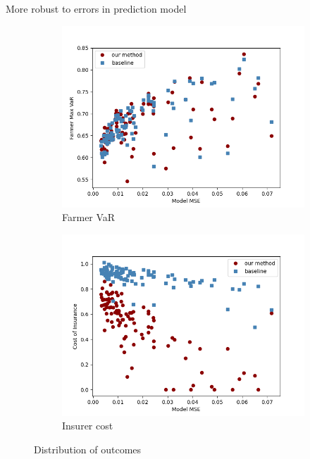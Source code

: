 \documentclass{beamer}
\begin{document}
\begin{frame}{More robust to errors in prediction model}
    \begin{figure}
        \centering
          \begin{subfigure}[b]{0.47\textwidth}
            \includegraphics[width=\textwidth]{../../../output/figures/Logit_Bootstrap/Max_VaR_vs_error_nonlinear.png}
            \caption{Farmer VaR}
          \end{subfigure}
         \hfill
          \begin{subfigure}[b]{0.47\textwidth}
            \includegraphics[width=\textwidth]{../../../output/figures/Logit_Bootstrap/cost_vs_error_nonlinear.png}
            \caption{Insurer cost}
          \end{subfigure}
          \caption{Distribution of outcomes}
        \end{figure}
\end{frame}
\end{document}
